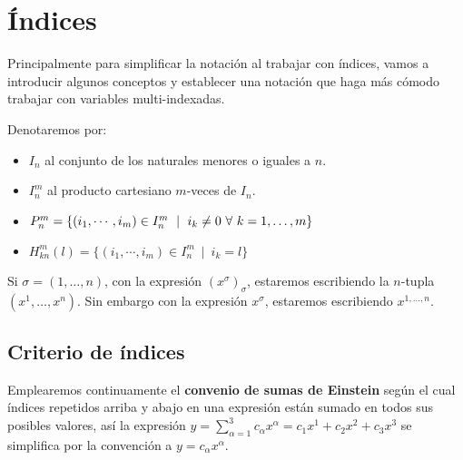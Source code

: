 \section{\'Indices}\label{sec:indices}
Principalmente para simplificar la notación al trabajar con índices, vamos
a introducir algunos conceptos y establecer una notación que haga más cómodo
trabajar con variables multi-indexadas.

\begin{notation}
  Denotaremos por:
  \begin{itemize}
    \item $I_n$ al conjunto de los naturales menores o iguales a $n$.
    \item $I_n^m$ al producto cartesiano $m$-veces de $I_n$.
    \item $P_n^m=\{(i_1,\cdots,i_m)\in I_n^m\ \mid \ i_k\neq 0\ \forall\ \indexdots{k}{1}{m}\}$
    \item $H_{kn}^m(l)=\{(i_1,\cdots,i_m)\in I_n^m\ \mid \ i_k=l\}$
  \end{itemize}
\end{notation}

\begin{notation}
  Si $\sigma=(1,\ldots,n)$, con la expresión $(x^\sigma)_\sigma$, estaremos escribiendo la $n$-tupla $(x^1,\ldots,
  x^n)$.
  Sin embargo con la expresión $x^\sigma$, estaremos escribiendo $x^{1,\ldots,n}$.
\end{notation}

\subsection{Criterio de índices}\label{subsec:criterio-de-indices}

Emplearemos continuamente el \textbf{convenio de sumas de Einstein} según el cual
índices repetidos arriba y abajo en una expresión están sumado en todos sus posibles valores,
así la expresión $y=\sum_{\alpha=1}^3 c_\alpha x^\alpha=c_1 x^1 + c_2 x^2 + c_3 x^3$
se simplifica por la convención a $y = c_\alpha x^\alpha$.
